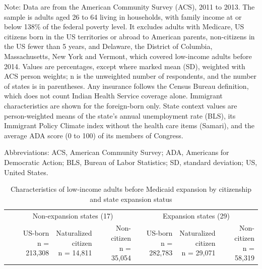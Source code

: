 \begin{landscape}
\begingroup\renewcommand{\baselinestretch}{1}\footnotesize\setlength{\LTcapwidth}{\linewidth}

\begin{ThreePartTable}
\begin{TableNotes}
\item Note: Data are from the American Community Survey (ACS), 2011 to 2013. The sample is adults aged 26 to 64 living in households, with family income at or below 138\% of the federal poverty level. It excludes adults with Medicare, US citizens born in the US territories or abroad to American parents, non-citizens in the US fewer than 5 years, and Delaware, the District of Columbia, Massachusetts, New York and Vermont, which covered low-income adults before 2014. Values are percentages, except where marked mean (SD), weighted with ACS person weights; n is the unweighted number of respondents, and the number of states is in parentheses. Any insurance follows the Census Bureau definition, which does not count Indian Health Service coverage alone. Immigrant characteristics are shown for the foreign-born only. State context values are person-weighted means of the state's annual unemployment rate (BLS), its Immigrant Policy Climate index without the health care items (Samari), and the average ADA score (0 to 100) of its members of Congress. 
\item Abbreviations: ACS, American Community Survey; ADA, Americans for Democratic Action; BLS, Bureau of Labor Statistics; SD, standard deviation; US, United States.
\end{TableNotes}
\begin{longtable}[t]{lrrrrrr}
\caption{Characteristics of low-income adults before Medicaid expansion by citizenship and state expansion status}\\
\toprule
\multicolumn{1}{c}{ } & \multicolumn{3}{c}{Non-expansion states (17)} & \multicolumn{3}{c}{Expansion states (29)} \\
\cmidrule(l{3pt}r{3pt}){2-4} \cmidrule(l{3pt}r{3pt}){5-7}
 & \makecell[br]{US-born\\n = 213,308} & \makecell[br]{Naturalized\\citizen\\n = 14,811} & \makecell[br]{Non-citizen\\n = 35,054} & \makecell[br]{US-born\\n = 282,783} & \makecell[br]{Naturalized\\citizen\\n = 29,071} & \makecell[br]{Non-citizen\\n = 58,319}\\

\end{longtable}
\end{ThreePartTable}
\end{landscape}

